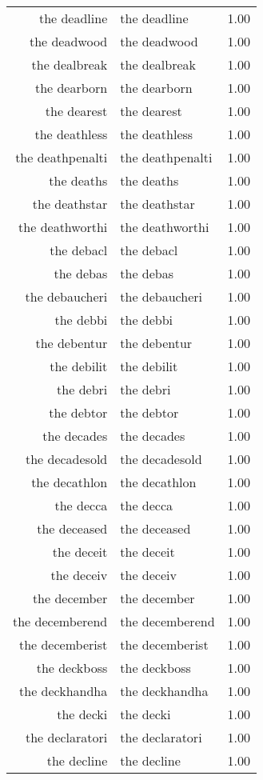 \begin{table}[ht]
\begin{tabular}{rlr}
  the deadline & the deadline & 1.00 \\ 
  the deadwood & the deadwood & 1.00 \\ 
  the dealbreak & the dealbreak & 1.00 \\ 
  the dearborn & the dearborn & 1.00 \\ 
  the dearest & the dearest & 1.00 \\ 
  the deathless & the deathless & 1.00 \\ 
  the deathpenalti & the deathpenalti & 1.00 \\ 
  the deaths & the deaths & 1.00 \\ 
  the deathstar & the deathstar & 1.00 \\ 
  the deathworthi & the deathworthi & 1.00 \\ 
  the debacl & the debacl & 1.00 \\ 
  the debas & the debas & 1.00 \\ 
  the debaucheri & the debaucheri & 1.00 \\ 
  the debbi & the debbi & 1.00 \\ 
  the debentur & the debentur & 1.00 \\ 
  the debilit & the debilit & 1.00 \\ 
  the debri & the debri & 1.00 \\ 
  the debtor & the debtor & 1.00 \\ 
  the decades & the decades & 1.00 \\ 
  the decadesold & the decadesold & 1.00 \\ 
  the decathlon & the decathlon & 1.00 \\ 
  the decca & the decca & 1.00 \\ 
  the deceased & the deceased & 1.00 \\ 
  the deceit & the deceit & 1.00 \\ 
  the deceiv & the deceiv & 1.00 \\ 
  the december & the december & 1.00 \\ 
  the decemberend & the decemberend & 1.00 \\ 
  the decemberist & the decemberist & 1.00 \\ 
  the deckboss & the deckboss & 1.00 \\ 
  the deckhandha & the deckhandha & 1.00 \\ 
  the decki & the decki & 1.00 \\ 
  the declaratori & the declaratori & 1.00 \\ 
  the decline & the decline & 1.00 \\ 

\end{tabular}
\end{table}
